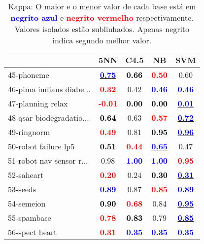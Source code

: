 \begin{table}
\caption{Kappa: O maior e o menor valor de cada base está em \textcolor{blue}{\textbf{negrito azul}} e \textcolor{red}{\textbf{negrito vermelho}} respectivamente. Valores isolados estão sublinhados. Apenas negrito indica segundo melhor valor.}
\begin{center}\begin{tabular}{lc|c|c|c}
 & 5NN & C4.5 & NB & SVM\\
 \hline 
45-phoneme & \underline{\textcolor{blue}{\textbf{  0.75}}} & \textcolor{black}{\textbf{  0.66}} & \textcolor{red}{\textbf{  0.50}} &   0.60 \\
46-pima indians diabe... & \textcolor{red}{\textbf{  0.32}} &   0.42 & \textcolor{blue}{\textbf{  0.46}} & \textcolor{blue}{\textbf{  0.46}} \\
47-planning relax & \textcolor{red}{\textbf{ -0.01}} & \textcolor{black}{\textbf{  0.00}} & \textcolor{black}{\textbf{  0.00}} & \underline{\textcolor{blue}{\textbf{  0.01}}} \\
48-qsar biodegradatio... & \textcolor{black}{\textbf{  0.64}} &   0.63 & \textcolor{red}{\textbf{  0.57}} & \underline{\textcolor{blue}{\textbf{  0.72}}} \\
49-ringnorm & \textcolor{red}{\textbf{  0.49}} &   0.81 & \textcolor{black}{\textbf{  0.95}} & \underline{\textcolor{blue}{\textbf{  0.96}}} \\ \hline
50-robot failure lp5 & \textcolor{black}{\textbf{  0.51}} & \textcolor{red}{\textbf{  0.44}} & \underline{\textcolor{blue}{\textbf{  0.65}}} &   0.47 \\
51-robot nav sensor r... &   0.98 & \textcolor{blue}{\textbf{  1.00}} & \textcolor{blue}{\textbf{  1.00}} & \textcolor{red}{\textbf{  0.95}} \\
52-saheart & \textcolor{red}{\textbf{  0.20}} &   0.24 & \textcolor{black}{\textbf{  0.30}} & \underline{\textcolor{blue}{\textbf{  0.31}}} \\
53-seeds & \textcolor{blue}{\textbf{  0.89}} &   0.87 & \textcolor{red}{\textbf{  0.85}} & \textcolor{blue}{\textbf{  0.89}} \\
54-semeion & \textcolor{black}{\textbf{  0.90}} & \textcolor{red}{\textbf{  0.68}} &   0.84 & \underline{\textcolor{blue}{\textbf{  0.95}}} \\ \hline
55-spambase & \textcolor{red}{\textbf{  0.78}} & \textcolor{black}{\textbf{  0.83}} &   0.79 & \underline{\textcolor{blue}{\textbf{  0.85}}} \\
56-spect heart & \textcolor{red}{\textbf{  0.31}} & \textcolor{blue}{\textbf{  0.35}} & \textcolor{blue}{\textbf{  0.35}} & \textcolor{blue}{\textbf{  0.35}} \\

\end{tabular}
\end{center}
\end{table}
